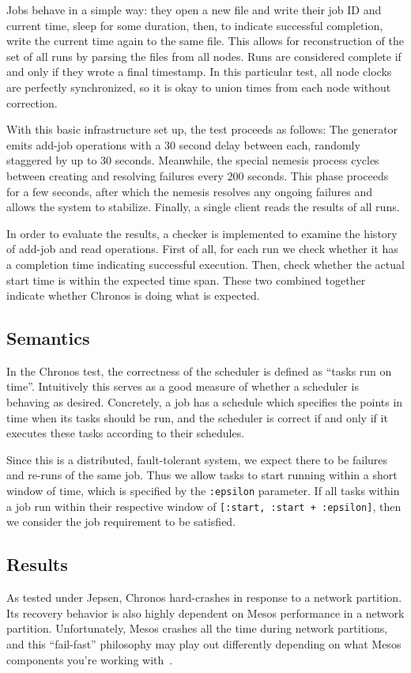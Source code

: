 \documentclass[letterpaper,twocolumn,10pt]{article}
\begin{document}
Jobs behave in a simple way: they open a new file and write their job ID and current time, sleep for some duration, then, to indicate successful completion, write the current time again to the same file. This allows for reconstruction of the set of all runs by parsing the files from all nodes. Runs are considered complete if and only if they wrote a final timestamp. In this particular test, all node clocks are perfectly synchronized, so it is okay to union times from each node without correction.

With this basic infrastructure set up, the test proceeds as follows: The generator emits add-job operations with a 30 second delay between each, randomly staggered by up to 30 seconds. Meanwhile, the special nemesis process cycles between creating and resolving failures every 200 seconds. This phase proceeds for a few seconds, after which the nemesis resolves any ongoing failures and allows the system to stabilize. Finally, a single client reads the results of all runs.

In order to evaluate the results, a checker is implemented to examine the history of add-job and read operations. First of all, for each run we check whether it has a completion time indicating successful execution. Then, check whether the actual start time is within the expected time span. These two combined together indicate whether Chronos is doing what is expected.

\subsection{Semantics}
In the Chronos test, the correctness of the scheduler is defined as ``tasks run on time''. Intuitively this serves as a good measure of whether a scheduler is behaving as desired. Concretely, a job has a schedule which specifies the points in time when its tasks should be run, and the scheduler is correct if and only if it executes these tasks according to their schedules.

Since this is a distributed, fault-tolerant system, we expect there to be failures and re-runs of the same job. Thus we allow tasks to start running within a short window of time, which is specified by the \verb|:epsilon| parameter. If all tasks within a job run within their respective window of \verb|[:start, :start + :epsilon]|, then we consider the job requirement to be satisfied.

\subsection{Results}
As tested under Jepsen, Chronos hard-crashes in response to a network partition. Its recovery behavior is also highly dependent on Mesos performance in a network partition. Unfortunately, Mesos crashes all the time during network partitions, and this “fail-fast” philosophy may play out differently depending on what Mesos components you’re working with~\cite{Chronos}.
\end{document}
